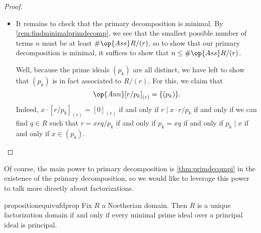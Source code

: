 \begin{proof}
\begin{itemize}
		\item It remains to check that the primary decomposition is minimal. By \autoref{rem:findminimalprimdecomp}, we see that the smallest possible number of terms $n$ must be at least $\#\op{Ass}R/(r)$, so to show that our primary decomposition is minimal, it suffices to show that $n\le\#\op{Ass}R/(r)$.

		Well, because the prime ideals $(p_k)$ are all distinct, we have left to show that $(p_k)$ is in fact associated to $R/(r)$. For this, we claim that
		\[\op{Ann}[r/p_k]_{(r)}=\{(p_k)\}.\]
		Indeed, $x\cdot[r/p_k]_{(r)}=[0]_{(r)}$ if and only if $r\mid x\cdot r/p_k$ if and only if we can find $q\in R$ such that $r=xrq/p_k$ if and only if $p_k=xq$ if and only if $p_k\mid x$ if and only if $x\in(p_k)$.
		\qedhere
	\end{itemize}
\end{proof}
Of course, the main power to primary decomposition is \autoref{thm:primdecompi} in the existence of the primary decomposition, so we would like to leverage this power to talk more directly about factorizations.
\begin{restatable}{proposition}{equivufdprop} \label{prop:equivufd}
	Fix $R$ a Noetherian domain. Then $R$ is a unique factorization domain if and only if every minimal prime ideal over a principal ideal is principal.
\end{restatable}
